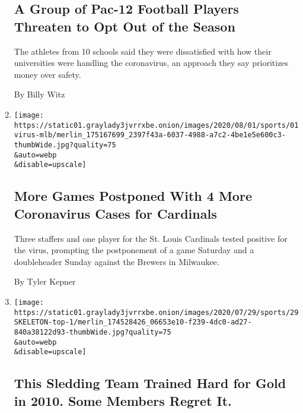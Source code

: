 \begin{enumerate}
  \hypertarget{a-group-of-pac-12-football-players-threaten-to-opt-out-of-the-season}{%
  \subsection{A Group of Pac-12 Football Players Threaten to Opt Out of
  the
  Season}\label{a-group-of-pac-12-football-players-threaten-to-opt-out-of-the-season}}

  The athletes from 10 schools said they were dissatisfied with how
  their universities were handling the coronavirus, an approach they say
  prioritizes money over safety.

  By Billy Witz
\item
  \href{/2020/08/01/sports/baseball/coronavirus-cardinals.html}{}

  \texttt{[image: https://static01.graylady3jvrrxbe.onion/images/2020/08/01/sports/01virus-mlb/merlin\_175167699\_2397f43a-6037-4988-a7c2-4be1e5e600c3-thumbWide.jpg?quality=75\\\&auto=webp\\\&disable=upscale]}

  \hypertarget{more-games-postponed-with-4-more-coronavirus-cases-for-cardinals}{%
  \subsection{More Games Postponed With 4 More Coronavirus Cases for
  Cardinals}\label{more-games-postponed-with-4-more-coronavirus-cases-for-cardinals}}

  Three staffers and one player for the St. Louis Cardinals tested
  positive for the virus, prompting the postponement of a game Saturday
  and a doubleheader Sunday against the Brewers in Milwaukee.

  By Tyler Kepner
\item
  \href{/2020/08/01/sports/olympics/concussion-skeleton-sledding-brain-damage.html}{}

  \texttt{[image: https://static01.graylady3jvrrxbe.onion/images/2020/07/29/sports/29SKELETON-top-1/merlin\_174528426\_06653e10-f239-4dc0-ad27-840a38122d93-thumbWide.jpg?quality=75\\\&auto=webp\\\&disable=upscale]}

  \hypertarget{this-sledding-team-trained-hard-for-gold-in-2010-some-members-regret-it}{%
  \subsection{This Sledding Team Trained Hard for Gold in 2010. Some
  Members Regret
  It.}\label{this-sledding-team-trained-hard-for-gold-in-2010-some-members-regret-it}}


\end{enumerate}
